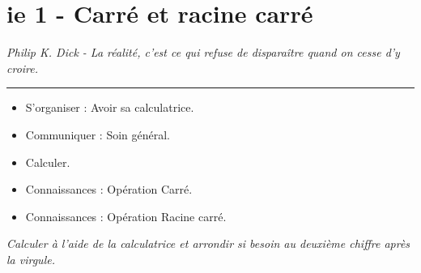 \documentclass[12pt]{article}
\newcommand{\horrule}[1]{\rule{\linewidth}{#1}} %
\begin{document}

\newtheorem{Definition}{Définition}
\newtheorem{Theorem}{Théorème}
\newtheorem{Proposition}{Propriété}

\renewcommand{\labelitemi}{$\bullet$}
\renewcommand{\labelitemii}{$\circ$}

\setlength{\columnseprule}{1pt}

\section*{ie 1 - Carré et racine carré}
\begin{center}
\textit{Philip K. Dick - La réalité, c'est ce qui refuse de disparaître quand on cesse d'y croire.}
\end{center}
\horrule{2px}

\begin{multicols}{2}
\begin{itemize}
\item S'organiser : Avoir sa calculatrice.
\item Communiquer : Soin général.
\item Calculer.
\item Connaissances : Opération Carré.
\item Connaissances : Opération Racine carré.
\end{itemize}
\end{multicols}

\textit{Calculer à l'aide de la calculatrice et arrondir si besoin au deuxième chiffre après la virgule.}
\end{document}
